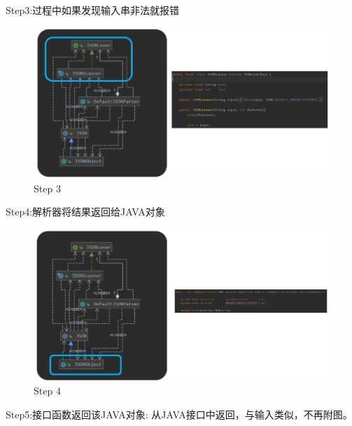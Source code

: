 \documentclass{article}
\begin{document}
Step3:过程中如果发现输入串非法就报错
\begin{figure}[H]
\centering %
\includegraphics[width = 14cm]{pic11.png}
\caption{Step 3}
\end{figure}

Step4:解析器将结果返回给JAVA对象
\begin{figure}[H]
\centering %
\includegraphics[width = 14cm]{pic12.png}
\caption{Step 4}
\end{figure}

Step5:接口函数返回该JAVA对象: 从JAVA接口中返回，与输入类似，不再附图。
\end{document}
